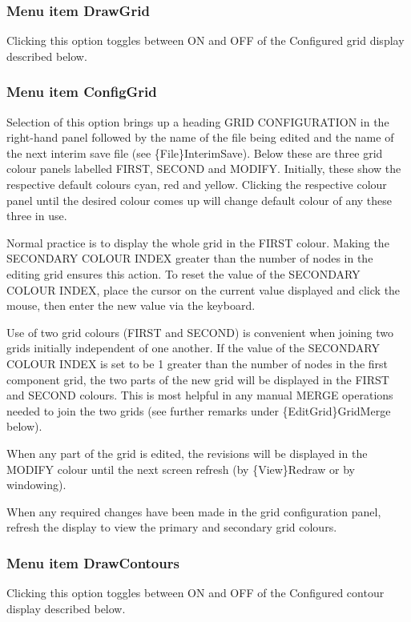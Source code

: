 \documentclass{article}
\begin{document}
\subsubsection[Menu item DrawGrid]{Menu item DrawGrid}
Clicking this option toggles between ON and OFF of the Configured grid display described below.

\subsubsection[Menu item ConfigGrid]{Menu item ConfigGrid}
Selection of this option brings up a heading GRID CONFIGURATION in the right-hand panel followed by the name of the file being edited and the name of the next interim save file (see \{File\}InterimSave). Below these are three grid colour panels labelled FIRST, SECOND and MODIFY. Initially, these show the respective default colours cyan, red and yellow. Clicking the respective colour panel until the desired colour comes up will change default colour of any these three in use.

Normal practice is to display the whole grid in the FIRST colour. Making the SECONDARY COLOUR INDEX greater than the number of nodes in the editing grid ensures this action. To reset the value of the SECONDARY COLOUR INDEX, place the cursor on the current value displayed and click the mouse, then enter the new value via the keyboard.

Use of two grid colours (FIRST and SECOND) is convenient when joining two grids initially independent of one another. If the value of the SECONDARY COLOUR INDEX is set to be 1 greater than the number of nodes in the first component grid, the two parts of the new grid will be displayed in the FIRST and SECOND colours. This is most helpful in any manual MERGE operations needed to join the two grids (see further remarks under \{EditGrid\}GridMerge below).

When any part of the grid is edited, the revisions will be displayed in the MODIFY colour until the next screen refresh (by \{View\}Redraw or by windowing).

When any required changes have been made in the grid configuration panel, refresh the display to view the primary and secondary grid colours.

\subsubsection[Menu item DrawContours]{Menu item DrawContours}
Clicking this option toggles between ON and OFF of the Configured contour display described below.
\end{document}
